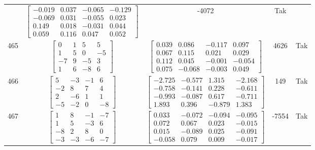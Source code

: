 \documentclass[a4paper,12pt]{article}
\begin{document}
\begin{tabular}{c c c c c}
&
$\begin{bmatrix} -0.019 & 0.037 & -0.065 & -0.129 \\ -0.069 & 0.031 & -0.055 & 0.023 \\ 0.149 & 0.018 & -0.031 & 0.044 \\ 0.059 & 0.116 & 0.047 & 0.052 \end{bmatrix}$
&
-4072
&
Tak
\\
465
&
$\begin{bmatrix} 0 & 1 & 5 & 5 \\ 1 & 5 & 0 & -5 \\ -7 & 9 & -5 & 3 \\ 1 & 6 & -8 & 6 \end{bmatrix}$
&
$\begin{bmatrix} 0.039 & 0.086 & -0.117 & 0.097 \\ 0.067 & 0.115 & 0.021 & 0.029 \\ 0.112 & 0.045 & -0.001 & -0.054 \\ 0.075 & -0.068 & -0.003 & 0.049 \end{bmatrix}$
&
4626
&
Tak
\\
466
&
$\begin{bmatrix} 5 & -3 & -1 & 6 \\ -2 & 8 & 7 & 4 \\ 2 & -6 & 1 & 1 \\ -5 & -2 & 0 & -8 \end{bmatrix}$
&
$\begin{bmatrix} -2.725 & -0.577 & 1.315 & -2.168 \\ -0.758 & -0.141 & 0.228 & -0.611 \\ -0.993 & -0.087 & 0.617 & -0.711 \\ 1.893 & 0.396 & -0.879 & 1.383 \end{bmatrix}$
&
149
&
Tak
\\
467
&
$\begin{bmatrix} 1 & 8 & -1 & -7 \\ 1 & 5 & -3 & 6 \\ -8 & 2 & 8 & 0 \\ -3 & -3 & -6 & -7 \end{bmatrix}$
&
$\begin{bmatrix} 0.033 & -0.072 & -0.094 & -0.095 \\ 0.072 & 0.067 & 0.023 & -0.015 \\ 0.015 & -0.089 & 0.025 & -0.091 \\ -0.058 & 0.079 & 0.009 & -0.017 \end{bmatrix}$
&
-7554
&
Tak
\\

\end{tabular}
\end{document}
